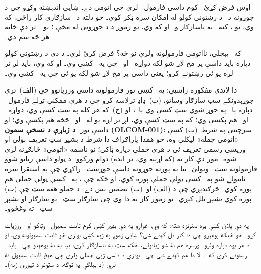 \documentclass[12pt,a4paper,oneside]{report}
\theoremstyle{definition}
\begin{document}
\label{olpseg:OLP-0128-B008:start}
اوس فرض کړئ~\LR{$\Gamma$} کوم داسې فارمول~ لري چې
 اتومي دے۔ ښايي اندېښنه وکړو چې د
 جوړونه د~ د
رښتوني کولو له امکان سره ټکر کوي۔ خو دلته د~\LR{$\Gamma$} سازګاري
کار راځي: که  وي، نو
، کنه~\LR{$\Gamma$} به ناسازګار و۔ او که
 وي، نو زموږ د
 د جوړونې له مخې
؛ نو
۔ تر دې ځايه هر څه سم
دي۔
\label{olpseg:OLP-0128-B008:end}

\label{olpseg:OLP-0128-B009:start}
که~\LR{$\Gamma$} پېچلي، نااتومي فارمولونه ولري نو څه؟ فرض کړئ
 لري۔ د دې د رښتوني کولو دپاره بايد داسې پر مخ لاړ
شو لکه دواړه~ او~ چې په~\LR{$\Gamma$} کښې وي۔ او که
 وي، بايد لږ تر لږه يو ئې رښتونے کړو؛
يعنې داسې پر مخ لاړ شو لکه يو ئې چې په~\LR{$\Gamma$} کښې وي۔
\label{olpseg:OLP-0128-B009:end}

\label{olpseg:OLP-0128-B010:start}
دا لاندې مفکوره راښيي: په~\LR{$\Gamma$} کښې نور فارمولونه داسې
ورزياتوو چې (الف)~ترې جوړېدونکے سټ سازګار وساتو، (ب)~ډاډ ترلاسه
کړو چې د هرې ممکنې تړلے فارمول~ دپاره يا~ په
جوړ شوي سټ کښې وي يا~، او (ج)~که هر کله
 په سټ کښې وي، دواړه~ او~ هم پکښې وي؛ که
 په سټ کښې وي، لږ تر لږه يو له~ او~ څخه هم
پکښې وي؛ او داسې نور۔ \textbf{د ژباړې د نسخې سمون (OLCOM-001):}
سرچينې په شرط~(ب) کښې «اتومي جمله» ليکلې وه، خو همدا پاراګراف دا
شرط د بشپړ سټ تعريف بولي او ورپسې رسمي تعريف ئې د هرې جملې دپاره
ټاکي؛ نو ناسمه «اتومي» ځانګړنه لرې شوه۔ موږ دې کار ته (که اړينه
وي، تر ابده) دوام
ورکوو۔ د ټولو داسې زياتو شوو فارمولونه سټ~\LR{$\Gamma^*$} وبولئ۔
بيا به پورته جوړونه داسې
جوړښت~
راکړي چې په استقرا سره ثابتولے شو په~\LR{$\Gamma^*$} کښې ټولې جملې
پوره کوي، او ځکه چې \LR{$\Gamma \subseteq \Gamma^*$}، په~\LR{$\Gamma$}
کښې ټولې جملې هم پوره کوي۔ څرګندېږي چې د (الف) او~(ب) تضمين بس
دے۔ د جملو هغه سټ چې (ب) پوره کوي \emph{بشپړ} بلل کېږي۔ نو زموږ
کار به دا وي چې سازګار سټ~\LR{$\Gamma$} يو سازګار او بشپړ
سټ~\LR{$\Gamma^*$} ته وغځوو۔
\label{olpseg:OLP-0128-B010:end}

\label{olpseg:OLP-0128-B011:start}
%
په دې پلان کښې يوه ستونزه شته: که
\LR{$\lexists[x][!A(x)] \in \Gamma$} وي، غواړو په دې بهير کښې کوم
ثابت سمبول~ وټاکو او~ ورزيات کړو۔ خو څنګه پوهېږو چې
دا کار تل کېدے شي؟ ښايي زموږ په ژبه کښې يوازې څو ثابت سمبولونه
وي، او د هر يوه دپاره  ولرو۔ ورسره
 هم نۀ شو زياتولے، ځکه سټ به ناسازګار کړي؛ بيا به نۀ پوهېدو
چې~ بايد~ رښتونے کړي که~۔ لا دا
هم کېدے شي چې~\LR{$\Gamma$} يوازې د داسې ژبې جملې ولري چې هېڅ ثابت
سمبول نۀ لري (د بېلګې په توګه، د سټونو د تيورۍ ژبه)۔
\label{olpseg:OLP-0128-B011:end}
\end{document}
